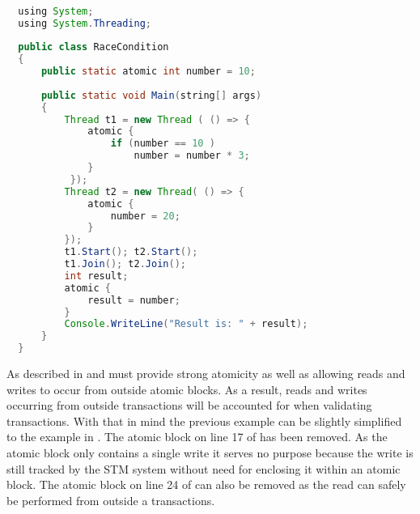 \begin{lstlisting}[label=lst:stm_atomic_syntax,
  caption={Transaction Syntax},
  language=Java,  
  showspaces=false,
  showtabs=false,
  breaklines=true,
  showstringspaces=false,
  breakatwhitespace=true,
  commentstyle=\color{greencomments},
  keywordstyle=\color{bluekeywords},
  stringstyle=\color{redstrings},
  morekeywords={atomic, retry, orElse, var, get, set, using}]  % Start your code-block

  using System;
  using System.Threading;
  
  public class RaceCondition
  {
      public static atomic int number = 10;
  
      public static void Main(string[] args)
      {
          Thread t1 = new Thread ( () => {
              atomic {
                  if (number == 10 )           
                      number = number * 3;
              }
           });
          Thread t2 = new Thread( () => {
              atomic {
                  number = 20;
              }
          });
          t1.Start(); t2.Start();
          t1.Join(); t2.Join();
          int result;
          atomic {
              result = number;          
          }
          Console.WriteLine("Result is: " + result);
      }
  }
\end{lstlisting}

As described in  and  \stmnamesp must provide strong atomicity as well as allowing reads and writes to occur from outside atomic blocks. As a result, reads and writes occurring from outside transactions will be accounted for when validating transactions. With that in mind the previous example can be slightly simplified to the example in . The atomic block on line 17 of  has been removed. As the atomic block only contains a single write it serves no purpose because the write is still tracked by the \ac{STM} system without need for enclosing it within an atomic block. The atomic block on line 24 of  can also be removed as the read can safely be performed from outside a transactions.

